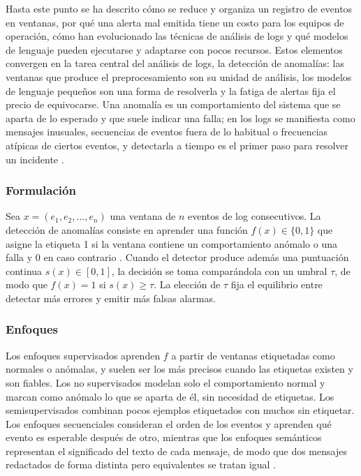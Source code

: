 Hasta este punto se ha descrito cómo se reduce y organiza un registro de eventos en ventanas, por qué una alerta mal emitida tiene un costo para los equipos de operación, cómo han evolucionado las técnicas de análisis de logs y qué modelos de lenguaje pueden ejecutarse y adaptarse con pocos recursos. Estos elementos convergen en la tarea central del análisis de logs, la detección de anomalías: las ventanas que produce el preprocesamiento son su unidad de análisis, los modelos de lenguaje pequeños son una forma de resolverla y la fatiga de alertas fija el precio de equivocarse. Una anomalía es un comportamiento del sistema que se aparta de lo esperado y que suele indicar una falla; en los logs se manifiesta como mensajes inusuales, secuencias de eventos fuera de lo habitual o frecuencias atípicas de ciertos eventos, y detectarla a tiempo es el primer paso para resolver un incidente \cite{he2021_survey}.

\subsubsection{Formulación}\label{sec:mt_formulacion}

Sea $x = (e_1, e_2, \ldots, e_n)$ una ventana de $n$ eventos de log consecutivos. La detección de anomalías consiste en aprender una función $f(x) \in \{0, 1\}$ que asigne la etiqueta 1 si la ventana contiene un comportamiento anómalo o una falla y 0 en caso contrario \cite{he2021_survey}. Cuando el detector produce además una puntuación continua $s(x) \in [0, 1]$, la decisión se toma comparándola con un umbral $\tau$, de modo que $f(x) = 1$ si $s(x) \geq \tau$. La elección de $\tau$ fija el equilibrio entre detectar más errores y emitir más falsas alarmas.

\subsubsection{Enfoques}\label{sec:mt_enfoques}

Los enfoques supervisados aprenden $f$ a partir de ventanas etiquetadas como normales o anómalas, y suelen ser los más precisos cuando las etiquetas existen y son fiables. Los no supervisados modelan solo el comportamiento normal y marcan como anómalo lo que se aparta de él, sin necesidad de etiquetas. Los semisupervisados combinan pocos ejemplos etiquetados con muchos sin etiquetar. Los enfoques secuenciales consideran el orden de los eventos y aprenden qué evento es esperable después de otro, mientras que los enfoques semánticos representan el significado del texto de cada mensaje, de modo que dos mensajes redactados de forma distinta pero equivalentes se tratan igual \cite{jiang2021_aiops}.

